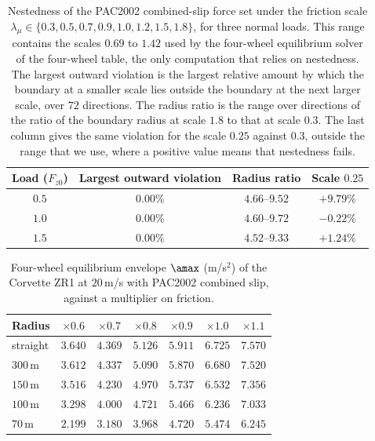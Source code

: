 \begin{table}[htbp]
\centering\small
\caption{Nestedness of the PAC2002 combined-slip force set under the friction scale $\lambda_\mu\in\{0.3,0.5,0.7,0.9,1.0,1.2,1.5,1.8\}$, for three normal loads. This range contains the scales $0.69$ to $1.42$ used by the four-wheel equilibrium solver of the four-wheel table, the only computation that relies on nestedness. The largest outward violation is the largest relative amount by which the boundary at a smaller scale lies outside the boundary at the next larger scale, over $72$ directions. The radius ratio is the range over directions of the ratio of the boundary radius at scale $1.8$ to that at scale $0.3$. The last column gives the same violation for the scale $0.25$ against $0.3$, outside the range that we use, where a positive value means that nestedness fails.}\label{tab:app-nest}
\begin{tabular}{cccc}
\toprule
Load ($F_{z0}$) & Largest outward violation & Radius ratio & Scale $0.25$\\
\midrule
$0.5$ & $0.00\%$ & $4.66$--$9.52$ & $+9.79\%$\\
$1.0$ & $0.00\%$ & $4.60$--$9.72$ & $-0.22\%$\\
$1.5$ & $0.00\%$ & $4.52$--$9.33$ & $+1.24\%$\\
\bottomrule
\end{tabular}
\end{table}

\begin{table}[htbp]
\centering\small
\caption{Four-wheel equilibrium envelope $\amax$ (m/s$^2$) of the Corvette ZR1 at $20$\,m/s with PAC2002 combined slip, against a multiplier on friction.}\label{tab:app-fourwheel}
\begin{tabular}{lcccccc}
\toprule
Radius & $\times0.6$ & $\times0.7$ & $\times0.8$ & $\times0.9$ & $\times1.0$ & $\times1.1$\\
\midrule
straight & $3.640$ & $4.369$ & $5.126$ & $5.911$ & $6.725$ & $7.570$\\
$300$\,m & $3.612$ & $4.337$ & $5.090$ & $5.870$ & $6.680$ & $7.520$\\
$150$\,m & $3.516$ & $4.230$ & $4.970$ & $5.737$ & $6.532$ & $7.356$\\
$100$\,m & $3.298$ & $4.000$ & $4.721$ & $5.466$ & $6.236$ & $7.033$\\
$70$\,m & $2.199$ & $3.180$ & $3.968$ & $4.720$ & $5.474$ & $6.245$\\
\bottomrule
\end{tabular}
\end{table}

